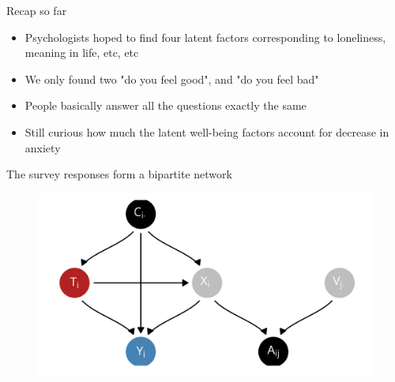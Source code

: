 \documentclass[aspectratio=169]{beamer}
\theoremstyle{remark}
\begin{document}
\begin{frame}{Recap so far}

    \begin{itemize}
        \item Psychologists hoped to find four latent factors corresponding to loneliness, meaning in life, etc, etc
        \item We only found two "do you feel good", and "do you feel bad"
        \item People basically answer all the questions exactly the same
        \item Still curious how much the latent well-being factors account for decrease in anxiety
    \end{itemize}

\end{frame}

\begin{frame}{The survey responses form a bipartite network}
    \centering
    \begin{figure}
        \includegraphics{figures/dags/bipartite-mediation.png}
    \end{figure}
\end{frame}
\end{document}
